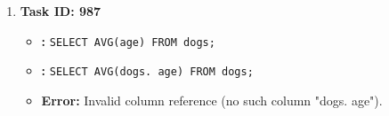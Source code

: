 \begin{enumerate}
    \item
    \textbf{Task ID: 987}
    \begin{itemize}
        \item \textbf{\Tool{}:} \texttt{SELECT AVG(age) FROM dogs;}
        \item \textbf{\syncode{}:} \texttt{SELECT AVG(dogs. age) FROM dogs;}
        \item \textbf{Error:} Invalid column reference (no such column "dogs. age").
    \end{itemize}
\end{enumerate}


